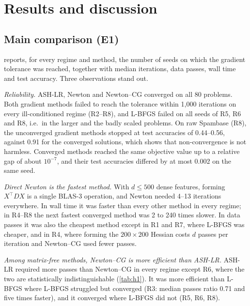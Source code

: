 \section{Results and discussion}\label{sec:results}

\subsection{Main comparison (E1)}
 reports, for every regime and method, the number of seeds on which
the gradient tolerance was reached, together with median iterations, data passes,
wall time and test accuracy. Three observations stand out.

\emph{Reliability.} ASH-LR, Newton and Newton--CG converged on all $80$ problems.
Both gradient methods failed to reach the tolerance within 1,000 iterations on every
ill-conditioned regime (R2--R8), and L-BFGS failed on all seeds of R5, R6 and R8,
i.e.\ in the larger and the badly scaled problems. On raw Spambase (R8), the
unconverged gradient methods stopped at test accuracies of 0.44--0.56, against 0.91
for the converged solutions, which shows that non-convergence is not harmless.
Converged methods reached the same objective value up to a relative gap of about
$10^{-7}$, and their test accuracies differed by at most $0.002$ on the same seed.

\emph{Direct Newton is the fastest method.} With $d\le500$ dense features, forming
$X^\top DX$ is a single BLAS-3 operation, and Newton needed 4--13 iterations
everywhere. In wall time it was faster than every other method in every regime; in R4--R8 the
next fastest converged method was 2 to 240 times slower. In data passes it was also
the cheapest method except in R1 and R7, where L-BFGS was cheaper, and in R4, where
forming the $200\times200$ Hessian costs $d$ passes per iteration and Newton--CG used
fewer passes.

\emph{Among matrix-free methods, Newton--CG is more efficient than ASH-LR.}
ASH-LR required more passes than Newton--CG in every regime except R6, where the
two are statistically indistinguishable (\cref{tab:h1}). It was more efficient than
L-BFGS where L-BFGS struggled but converged (R3: median passes ratio 0.71 and five
times faster), and it converged where L-BFGS did not (R5, R6, R8).

\begin{table}[p]
\centering
\caption{E1: main comparison, $w_0=0$, $\lambda=10^{-6}$, tolerance
$\norm{g}\le10^{-6}$. Conv.\ = seeds converged out of ten; the other columns are
medians over the ten seeds. Passes are products with $X$ or $X^\top$.}\label{tab:main}
\footnotesize

\end{table}

